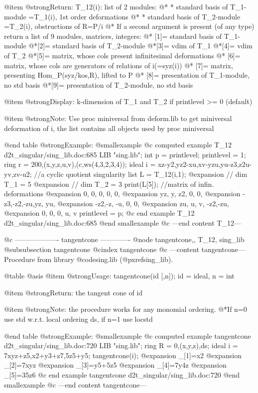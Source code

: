 @item @strong{Return:}
T_12(i): list of 2 modules: @*
* standard basis of T_1-module =T_1(i), 1st order deformations @*
* standard basis of T_2-module =T_2(i), obstructions of R=P/i @*
If a second argument is present (of any type) return a list of
9 modules, matrices, integers: @*
[1]= standard basis of T_1-module
@*[2]= standard basis of T_2-module
@*[3]= vdim of T_1
@*[4]= vdim of T_2
@*[5]= matrix, whose cols present infinitesimal deformations @*
[6]= matrix, whose cols are generators of relations of i(=syz(i)) @*
[7]= matrix, presenting Hom_P(syz/kos,R), lifted to P @*
[8]= presentation of T_1-module, no std basis
@*[9]= presentation of T_2-module, no std basis

@item @strong{Display:}
k-dimension of T_1 and T_2 if printlevel >= 0 (default)

@item @strong{Note:}
Use proc miniversal from deform.lib to get miniversal deformation of i,
the list contains all objects used by proc miniversal

@end table
@strong{Example:}
@smallexample
@c computed example T_12 d2t_singular/sing_lib.doc:685 
LIB "sing.lib";
int p      = printlevel;
printlevel = 1;
ring r     = 200,(x,y,z,u,v),(c,ws(4,3,2,3,4));
ideal i    = xz-y2,yz2-xu,xv-yzu,yu-z3,z2u-yv,zv-u2;
//a cyclic quotient singularity
list L     = T_12(i,1);
@expansion{} // dim T_1 = 5
@expansion{} // dim T_2 = 3
print(L[5]);             //matrix of infin. deformations
@expansion{} 0,  0,  0,  0,  0,  
@expansion{} yz, y,  z2, 0,  0,  
@expansion{} -z3,-z2,-zu,yz, yu, 
@expansion{} -z2,-z, -u, 0,  0,  
@expansion{} zu, u,  v,  -z2,-zu,
@expansion{} 0,  0,  0,  u,  v   
printlevel = p;
@c end example T_12 d2t_singular/sing_lib.doc:685
@end smallexample
@c ---end content T_12---

@c ------------------- tangentcone -------------
@node tangentcone,, T_12, sing_lib
@subsubsection tangentcone
@cindex tangentcone
@c ---content tangentcone---
Procedure from library @code{sing.lib} (@pxref{sing_lib}).

@table @asis
@item @strong{Usage:}
tangentcone(id [,n]); id = ideal, n = int

@item @strong{Return:}
the tangent cone of id

@item @strong{Note:}
the procedure works for any monomial ordering.
@*If n=0 use std w.r.t. local ordering ds, if n=1 use locstd

@end table
@strong{Example:}
@smallexample
@c computed example tangentcone d2t_singular/sing_lib.doc:720 
LIB "sing.lib";
ring R = 0,(x,y,z),ds;
ideal i  = 7xyz+z5,x2+y3+z7,5z5+y5;
tangentcone(i);
@expansion{} _[1]=x2
@expansion{} _[2]=7xyz
@expansion{} _[3]=y5+5z5
@expansion{} _[4]=7y4z
@expansion{} _[5]=35z6
@c end example tangentcone d2t_singular/sing_lib.doc:720
@end smallexample
@c ---end content tangentcone---
